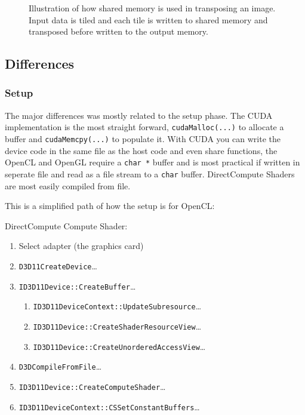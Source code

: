 \begin{figure}[h!]
	\centering
	
	\caption{Illustration of how shared memory is used in transposing an image. Input data is tiled and each tile is written to shared memory and transposed before written to the output memory. }
	\label{fig:transpose-memory}
\end{figure}

\subsection{Differences}

\subsubsection{Setup}

The major differences was mostly related to the setup phase. The CUDA implementation is the most straight forward, \texttt{cudaMalloc(...)} to allocate a buffer and \texttt{cudaMemcpy(...)} to populate it. With CUDA you can write the device code in the same file as the host code and even share functions, the OpenCL and OpenGL require a \texttt{char *} buffer and is most practical if written in seperate file and read as a file stream to a \texttt{char} buffer. DirectCompute Shaders are most easily compiled from file.

This is a simplified path of how the setup is for OpenCL:
\begin{figure}
	\centering	
	\def \setupWidth {{\textwidth} / 2 - 10pt}
	\hfill
	\newline
	\caption{}		
	\label{fig:code:setup:ocl}
\end{figure}

DirectCompute Compute Shader:
\begin{enumerate}
	\item Select adapter (the graphics card)
	\item \texttt{D3D11CreateDevice}\ldots
	\item \texttt{ID3D11Device::CreateBuffer}\ldots
	\begin{enumerate}
		\item \texttt{ID3D11DeviceContext::UpdateSubresource}\ldots
		\item \texttt{ID3D11Device::CreateShaderResourceView}\ldots
		\item \texttt{ID3D11Device::CreateUnorderedAccessView}\ldots
	\end{enumerate}
	\item \texttt{D3DCompileFromFile}\ldots
	\item \texttt{ID3D11Device::CreateComputeShader}\ldots
	\item \texttt{ID3D11DeviceContext::CSSetConstantBuffers}\ldots
\end{enumerate}

